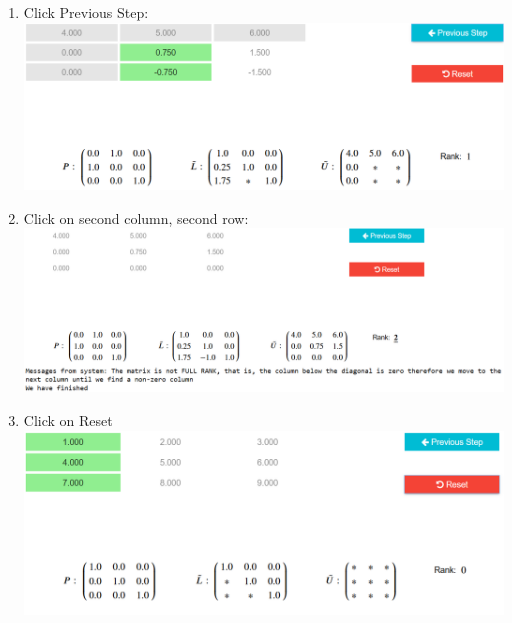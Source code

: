 {\begin{enumerate}
  \item Click Previous Step:\\
    \includegraphics[scale=0.45]{Include/Images/Thesis/Documentation/Visualizers/LUVisualizer/Example 1/Example 1 - 03 - Click Previous Step.png}
  \item Click on second column, second row:\\
    \includegraphics[scale=0.4]{Include/Images/Thesis/Documentation/Visualizers/LUVisualizer/Example 1/Example 1 - 04. - Click on 2 row.png}
  \item Click on Reset\\
      \includegraphics[scale=0.45]{Include/Images/Thesis/Documentation/Visualizers/LUVisualizer/Example 1/Example 1 - 05 - Click on Reset.png}
\end{enumerate}
}
